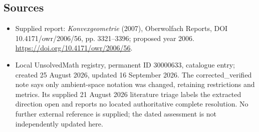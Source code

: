 \documentclass[11pt]{article}
\begin{document}
\subsection{Sources}
\begin{itemize}
\item Supplied report: \emph{Konvexgeometrie} (2007), Oberwolfach Reports, DOI 10.4171/owr/2006/56, pp. 3321--3396; proposed year 2006. \url{https://doi.org/10.4171/owr/2006/56}.
\item Local UnsolvedMath registry, permanent ID 30000633, catalogue entry; created 25 August 2026, updated 16 September 2026. The corrected\_verified note says only ambient-space notation was changed, retaining restrictions and metrics. Its supplied 21 August 2026 literature triage labels the extracted direction open and reports no located authoritative complete resolution. No further external reference is supplied; the dated assessment is not independently updated here.
\end{itemize}
\end{document}
